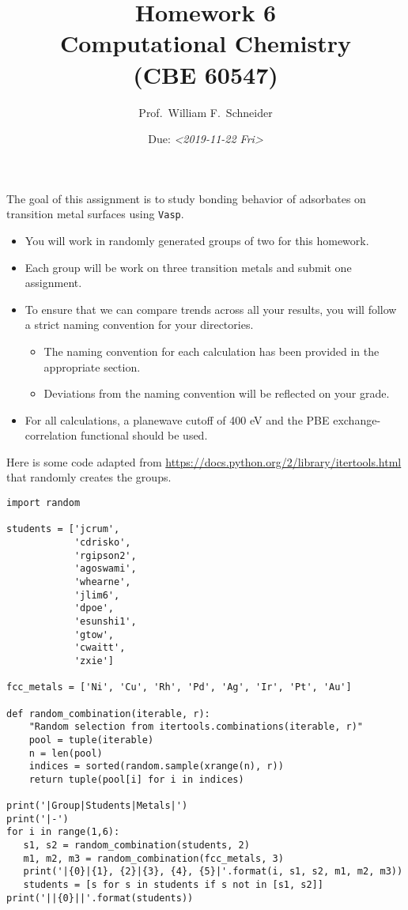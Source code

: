 \documentclass[11pt]{article}
\date{Due: \textit{<2019-11-22 Fri>}}
\title{}
\begin{document}
\title{Homework 6\\Computational Chemistry\\(CBE 60547)}
\author{Prof.\ William F.\ Schneider}
\maketitle

The goal of this assignment is to study bonding behavior of adsorbates on transition metal surfaces using \texttt{Vasp}.

\begin{itemize}
\item You will work in randomly generated groups of two for this homework.

\item Each group will be work on three transition metals and submit one assignment.

\item To ensure that we can compare trends across all your results, you will follow a strict naming convention for your directories. 
\begin{itemize}
\item The naming convention for each calculation has been provided in the appropriate section.
\item Deviations from the naming convention will be reflected on your grade.
\end{itemize}

\item For all calculations, a planewave cutoff of 400 eV and the PBE exchange-correlation functional should be used.
\end{itemize}

Here is some code adapted from \url{https://docs.python.org/2/library/itertools.html} that randomly creates the groups.

\begin{verbatim}
import random

students = ['jcrum',
            'cdrisko',
            'rgipson2',
            'agoswami',
            'whearne',
            'jlim6',
            'dpoe',
            'esunshi1',
            'gtow',
            'cwaitt',
            'zxie']

fcc_metals = ['Ni', 'Cu', 'Rh', 'Pd', 'Ag', 'Ir', 'Pt', 'Au'] 

def random_combination(iterable, r):
    "Random selection from itertools.combinations(iterable, r)"
    pool = tuple(iterable)
    n = len(pool)
    indices = sorted(random.sample(xrange(n), r))
    return tuple(pool[i] for i in indices)

print('|Group|Students|Metals|')
print('|-')
for i in range(1,6):
   s1, s2 = random_combination(students, 2)
   m1, m2, m3 = random_combination(fcc_metals, 3)
   print('|{0}|{1}, {2}|{3}, {4}, {5}|'.format(i, s1, s2, m1, m2, m3))
   students = [s for s in students if s not in [s1, s2]]
print('||{0}||'.format(students))
\end{verbatim}
\end{document}

